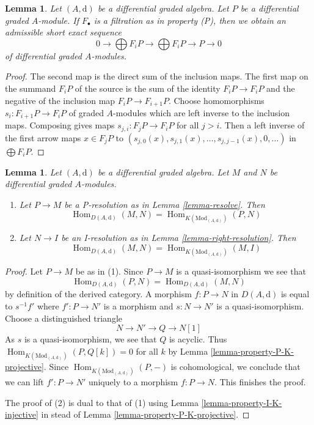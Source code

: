 \documentclass{stacks-project}
\theoremstyle{plain}
\newtheorem{lemma}[subsection]{Lemma}
\theoremstyle{definition}
\theoremstyle{remark}
\numberwithin{equation}{subsection}
\def\Hom{\mathop{\mathrm{Hom}}\nolimits}
\begin{document}
\begin{lemma}
\label{lemma-property-P-sequence}
Let $(A, \text{d})$ be a differential graded algebra.
Let $P$ be a differential graded $A$-module. If $F_\bullet$
is a filtration as in property (P), then we obtain an
admissible short exact sequence
$$
0 \to
\bigoplus\nolimits F_iP \to
\bigoplus\nolimits F_iP \to P \to 0
$$
of differential graded $A$-modules.
\end{lemma}

\begin{proof}
The second map is the direct sum of the inclusion maps.
The first map on the summand $F_iP$ of the source is the sum
of the identity $F_iP \to F_iP$ and the negative of the inclusion
map $F_iP \to F_{i + 1}P$. Choose homomorphisms $s_i : F_{i + 1}P \to F_iP$
of graded $A$-modules which are left inverse to the inclusion maps.
Composing gives maps $s_{j, i} : F_jP \to F_iP$ for all $j > i$.
Then a left inverse of the first arrow maps $x \in F_jP$ to
$(s_{j, 0}(x), s_{j, 1}(x), \ldots, s_{j, j - 1}(x), 0, \ldots)$
in $\bigoplus F_iP$.
\end{proof}

\begin{lemma}
\label{lemma-hom-derived}
Let $(A, \text{d})$ be a differential graded algebra.
Let $M$ and $N$ be differential graded $A$-modules.
\begin{enumerate}
\item Let $P \to M$ be a P-resolution as in
Lemma \ref{lemma-resolve}. Then
$$
\Hom_{D(A, \text{d})}(M, N) =
\Hom_{K(\text{Mod}_{(A, \text{d})})}(P, N)
$$
\item Let $N \to I$ be an I-resolution as in
Lemma \ref{lemma-right-resolution}. Then
$$
\Hom_{D(A, \text{d})}(M, N) =
\Hom_{K(\text{Mod}_{(A, \text{d})})}(M, I)
$$
\end{enumerate}
\end{lemma}

\begin{proof}
Let $P \to M$ be as in (1). Since $P \to M$ is a quasi-isomorphism we see that
$$
\Hom_{D(A, \text{d})}(P, N) = \Hom_{D(A, \text{d})}(M, N)
$$
by definition of the derived category. A morphism
$f : P \to N$ in $D(A, \text{d})$ is equal to
$s^{-1}f'$ where $f' : P \to N'$ is a morphism and
$s : N \to N'$ is a quasi-isomorphism. Choose a distinguished triangle
$$
N \to N' \to Q \to N[1]
$$
As $s$ is a quasi-isomorphism, we see that $Q$ is acyclic. Thus
$\Hom_{K(\text{Mod}_{(A, \text{d})})}(P, Q[k]) = 0$ for all $k$ by
Lemma \ref{lemma-property-P-K-projective}. Since
$\Hom_{K(\text{Mod}_{(A, \text{d})})}(P, -)$
is cohomological, we conclude that we can lift $f' : P \to N'$
uniquely to a morphism $f : P \to N$. This finishes the proof.

\medskip\noindent
The proof of (2) is dual to that of (1) using
Lemma \ref{lemma-property-I-K-injective} in stead of
Lemma \ref{lemma-property-P-K-projective}.
\end{proof}
\end{document}
